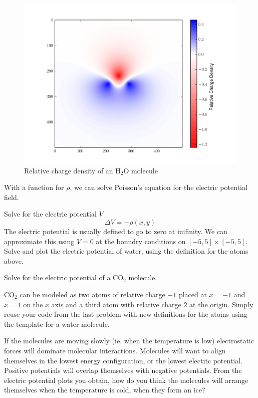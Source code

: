 \begin{figure}[ht]
\centering
\includegraphics[width=12cm]{waterRho.png}
\caption{Relative charge density of an H$_2$O molecule}
\label{figure3}
\end{figure}

With a function for $\rho$, we can solve Poisson's equation for the electric potential field.
\begin{problem}
Solve for the electric potential $V$
\[
		\Delta V = -\rho(x,y) 
\]
The electric potential is usually defined to go to zero at inifinity.
We can approximate this using $V=0$ at the boundry conditions on $[-5,5]\times [-5,5]$.
Solve and plot the electric potential of water, using the definition for the atoms above.

\end{problem}

\begin{problem}
Solve for the electric potential of a CO$_2$ molecule.

CO$_2$ can be modeled as two atoms of relative charge $-1$ placed at $x=-1$ and $x=1$ on the $x$ axis and a third atom with relative charge $2$ at the origin. Simply reuse your code from the last problem with new definitions for the atoms using the template for a water molecule.

If the molecules are moving slowly (ie. when the temperature is low) electrostatic forces will dominate molecular interactions. 
Molecules will want to align themselves in the lowest energy configuration, or the lowest electric potential. 
Positive potentials will overlap themselves with negative potentials. 
From the electric potential plots you obtain, how do you think the molecules will arrange themselves when the temperature is cold, when they form an ice?
\end{problem}

